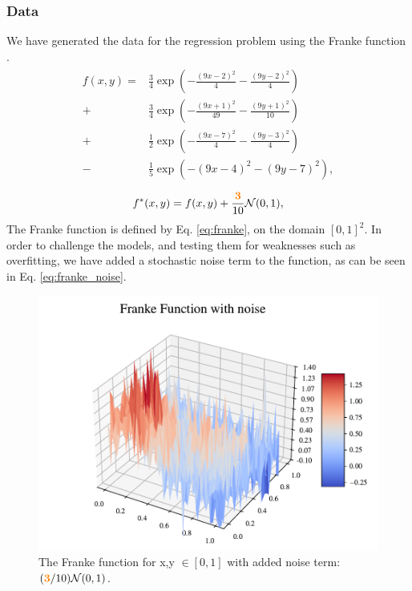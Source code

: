 \subsubsection{Data}
We have generated the data for the regression problem using the Franke function \citep[p. 13]{frank}.
\begin{align}
\begin{split}\label{eq:franke}
    f(x, y) = &\frac{3}{4} \exp\left( -\frac{(9x - 2)^2}{4} - \frac{(9y - 2)^2}{4} \right) \\
    + &\frac{3}{4} \exp\left( -\frac{(9x + 1)^2}{49} - \frac{(9y + 1)^2}{10} \right)  \\
    + &\frac{1}{2} \exp\left( -\frac{(9x - 7)^2}{4} - \frac{(9y - 3)^2}{4} \right)  \\
    - &\frac{1}{5} \exp\left( -(9x - 4)^2 - (9y - 7)^2 \right),
\end{split}
\end{align}
\begin{align}\label{eq:franke_noise}
    f^*(x,y) = f(x, y) + \frac{\textbf{\color{orange}{3}}}{10} \mathcal{N}(0, 1),
\end{align}
The Franke function is defined by Eq. \ref{eq:franke}, on the domain $[0, 1]^2$. 
In order to challenge the models, and testing them for weaknesses such as overfitting, we have added a stochastic noise term to the function, as can be seen in Eq. \ref{eq:franke_noise}.



\begin{figure}[h!]
\centering
\includegraphics[width=1\linewidth]{project_1/figures/figures_in_report/franke_func_noise.pdf}
\caption{The Franke function for x,y $\in [0,1]$ with added noise term: $(\textbf{\color{orange}{3}}/10) \mathcal{N}(0, 1)$.} 
\label{fig:franke_noise}
\end{figure}

